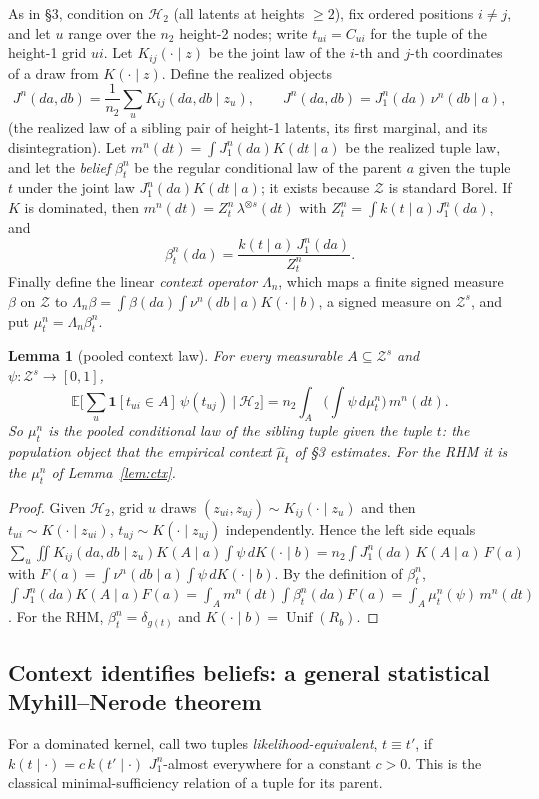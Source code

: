 \documentclass[11pt]{article}
\newtheorem{lemma}[theorem]{Lemma}
\theoremstyle{definition}
\newcommand{\E}{\mathbb{E}}
\newcommand{\Unif}{\operatorname{Unif}}
\newcommand{\cH}{\mathcal H}
\begin{document}
As in \S3, condition on $\cH_2$ (all latents at heights $\ge2$), fix ordered positions $i\ne j$,
and let $u$ range over the $n_2$ height-2 nodes; write $t_{ui}=C_{ui}$ for the tuple of the
height-1 grid $ui$. Let $K_{ij}(\cdot\mid z)$ be the joint law of the $i$-th and $j$-th
coordinates of a draw from $K(\cdot\mid z)$. Define the realized objects
\[
J^n(da,db)=\frac1{n_2}\sum_uK_{ij}(da,db\mid z_u),\qquad
J^n(da,db)=J^n_1(da)\,\nu^n(db\mid a),
\]
(the realized law of a sibling pair of height-1 latents, its first marginal, and its
disintegration). Let $m^n(dt)=\int J^n_1(da)K(dt\mid a)$ be the realized tuple law, and let the
\emph{belief} $\beta^n_t$ be the regular conditional law of the parent $a$ given the tuple $t$
under the joint law $J^n_1(da)K(dt\mid a)$; it exists because $\mathcal Z$ is standard Borel. If
$K$ is dominated, then $m^n(dt)=Z^n_t\,\lambda^{\otimes s}(dt)$ with $Z^n_t=\int k(t\mid a)J^n_1(da)$, and
\[
\beta^n_t(da)=\frac{k(t\mid a)\,J^n_1(da)}{Z^n_t}.
\]
Finally define the linear \emph{context operator} $\Lambda_n$, which maps a finite signed measure $\beta$ on
$\mathcal Z$ to $\Lambda_n\beta=\int\beta(da)\int\nu^n(db\mid a)K(\cdot\mid b)$, a signed measure on
$\mathcal Z^s$, and put $\mu^n_t=\Lambda_n\beta^n_t$.

\begin{lemma}[pooled context law]\label{lem:pooled}
For every measurable $A\subseteq\mathcal Z^s$ and $\psi:\mathcal Z^s\to[0,1]$,
\[
\E\Big[\sum_u\mathbf 1[t_{ui}\in A]\,\psi(t_{uj})\ \Big|\ \cH_2\Big]
=n_2\int_A\Big(\int\psi\,d\mu^n_t\Big)\,m^n(dt).
\]
So $\mu^n_t$ is the pooled conditional law of the sibling tuple given the tuple $t$: the
population object that the empirical context $\hat\mu_t$ of \S3 estimates. For the RHM it is the
$\mu^n_t$ of Lemma~\ref{lem:ctx}.
\end{lemma}
\begin{proof}
Given $\cH_2$, grid $u$ draws $(z_{ui},z_{uj})\sim K_{ij}(\cdot\mid z_u)$ and then $t_{ui}\sim
K(\cdot\mid z_{ui})$, $t_{uj}\sim K(\cdot\mid z_{uj})$ independently. Hence the left side equals
$\sum_u\iint K_{ij}(da,db\mid z_u)K(A\mid a)\int\psi\,dK(\cdot\mid b)=n_2\int J^n_1(da)\,K(A\mid a)\,F(a)$
with $F(a)=\int\nu^n(db\mid a)\int\psi\,dK(\cdot\mid b)$. By the definition of $\beta^n_t$,
$\int J^n_1(da)K(A\mid a)F(a)=\int_Am^n(dt)\int\beta^n_t(da)F(a)=\int_A\mu^n_t(\psi)\,m^n(dt)$. For the RHM,
$\beta^n_t=\delta_{g(t)}$ and $K(\cdot\mid b)=\Unif(R_b)$.
\end{proof}

\subsection{Context identifies beliefs: a general statistical Myhill--Nerode theorem}
For a dominated kernel, call two tuples \emph{likelihood-equivalent}, $t\equiv t'$, if $k(t\mid\cdot)=c\,k(t'\mid\cdot)$
$J^n_1$-almost everywhere for a constant $c>0$. This is the classical minimal-sufficiency
relation of a tuple for its parent.
\end{document}
